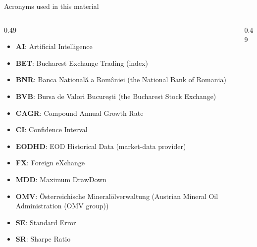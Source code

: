 {
\begin{frame}[noframenumbering]
    \titlepage
\end{frame}
}
\begin{frame}{Acronyms used in this material}
\begin{columns}[T]
\begin{column}{0.49\textwidth}
\begin{itemize}\setlength{\itemsep}{0pt}
    \item \textbf{AI}: Artificial Intelligence
    \item \textbf{BET}: Bucharest Exchange Trading (index)
    \item \textbf{BNR}: Banca Națională a României (the National Bank of Romania)
    \item \textbf{BVB}: Bursa de Valori București (the Bucharest Stock Exchange)
    \item \textbf{CAGR}: Compound Annual Growth Rate
    \item \textbf{CI}: Confidence Interval
    \item \textbf{EODHD}: EOD Historical Data (market-data provider)
    \item \textbf{FX}: Foreign eXchange
    \item \textbf{MDD}: Maximum DrawDown
    \item \textbf{OMV}: Österreichische Mineralölverwaltung (Austrian Mineral Oil Administration (OMV group))
    \item \textbf{SE}: Standard Error
    \item \textbf{SR}: Sharpe Ratio
\end{itemize}
\end{column}
\begin{column}{0.49\textwidth}
\end{column}
\end{columns}
\end{frame}

